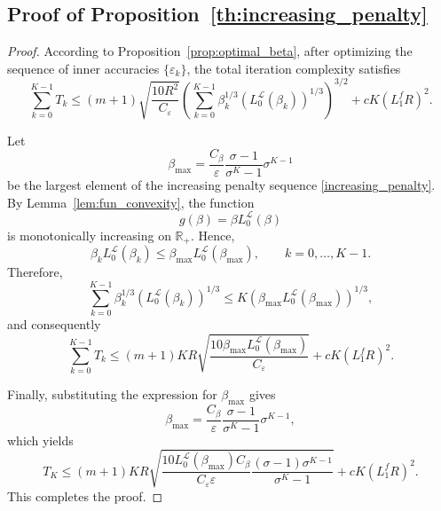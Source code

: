 \documentclass[runningheads]{llncs}
\begin{document}
	\subsection{Proof of Proposition~\ref{th:increasing_penalty}}\label{ap:th:increasing_penalty}
	
	\begin{proof}
		According to Proposition~\ref{prop:optimal_beta}, after optimizing the sequence of inner accuracies $\{\varepsilon_k\}$, the total iteration complexity satisfies
		\[
		\sum_{k=0}^{K-1}T_k
		\le
		(m+1)
		\sqrt{\frac{10R^2}{C_\varepsilon}}
		\left(
		\sum_{k=0}^{K-1}
		\beta_k^{1/3}
		\left(L_0^{\mathcal L}(\beta_k)\right)^{1/3}
		\right)^{3/2}
		+
		cK(L_1^fR)^2.
		\]
		
		Let
		\[
		\beta_{\max}
		=
		\frac{C_\beta}{\varepsilon}
		\frac{\sigma-1}{\sigma^K-1}
		\sigma^{K-1}
		\]
		be the largest element of the increasing penalty sequence
		\eqref{increasing_penalty}. By Lemma~\ref{lem:fun_convexity}, the function
		\[
		g(\beta)=\beta L_0^{\mathcal L}(\beta)
		\]
		is monotonically increasing on $\mathbb{R}_+$. Hence,
		\[
		\beta_kL_0^{\mathcal L}(\beta_k)
		\le
		\beta_{\max}L_0^{\mathcal L}(\beta_{\max}),
		\qquad
		k=0,\ldots,K-1.
		\]
		Therefore,
		\[
		\sum_{k=0}^{K-1}
		\beta_k^{1/3}
		\left(L_0^{\mathcal L}(\beta_k)\right)^{1/3}
		\le
		K
		\left(
		\beta_{\max}L_0^{\mathcal L}(\beta_{\max})
		\right)^{1/3},
		\]
		and consequently
		\[
		\sum_{k=0}^{K-1}T_k
		\le
		(m+1)
		KR
		\sqrt{
			\frac{10\beta_{\max}L_0^{\mathcal L}(\beta_{\max})}
			{C_\varepsilon}
		}
		+
		cK(L_1^fR)^2.
		\]
		
		Finally, substituting the expression for $\beta_{\max}$ gives
		\[
		\beta_{\max}
		=
		\frac{C_\beta}{\varepsilon}
		\frac{\sigma-1}{\sigma^K-1}
		\sigma^{K-1},
		\]
		which yields
		\[
		T_K
		\le
		(m+1)
		KR
		\sqrt{
			\frac{10L_0^{\mathcal L}(\beta_{\max})C_\beta}
			{C_\varepsilon\varepsilon}
			\frac{(\sigma-1)\sigma^{K-1}}
			{\sigma^K-1}
		}
		+
		cK(L_1^fR)^2.
		\]
		This completes the proof.
	\end{proof}
	
\end{document}
